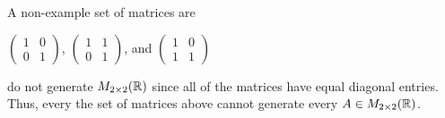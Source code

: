 \begin{eg}[Matrices]
A non-example set of matrices are
\begin{center}
    \( \begin{pmatrix}
        1 & 0 \\ 
        0 & 1 
    \end{pmatrix} \), \( \begin{pmatrix}
        1 & 1 \\
        0 & 1 
        \end{pmatrix} \), and \( \begin{pmatrix}
        1 & 0 \\
        1 & 1 
    \end{pmatrix} \)
\end{center}
do not generate \( M_{2 \times 2 }(\mathbb{R} ) \) since all of the matrices have equal diagonal entries. Thus, every the set of matrices above cannot generate every  \( A \in M_{2 \times 2 }(\mathbb{R} )  \).
\end{eg}




